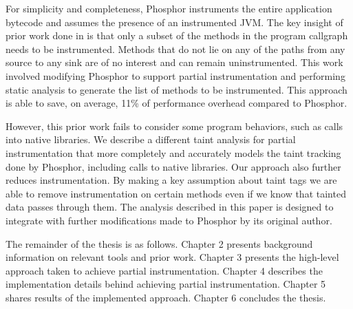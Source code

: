 For simplicity and completeness, Phosphor instruments the entire
application bytecode and assumes the presence of an instrumented
JVM. The key insight of prior work done in \cite{manoj_project} is
that only a subset of the methods in the program callgraph needs to be
instrumented. Methods that do not lie on any of the paths from any
source to any sink are of no interest and can remain
uninstrumented. This work involved modifying Phosphor to support
partial instrumentation and performing static analysis to generate the
list of methods to be instrumented. This approach is able to save, on
average, 11\% of performance overhead compared to Phosphor.

However, this prior work fails to consider some program behaviors,
such as calls into native libraries. We describe a different taint
analysis for partial instrumentation that more completely and
accurately models the taint tracking done by Phosphor, including calls
to native libraries. Our approach also further reduces
instrumentation. By making a key assumption about taint tags we are
able to remove instrumentation on certain methods even if we know that
tainted data passes through them. The analysis described in this paper
is designed to integrate with further modifications made to Phosphor
by its original author.

The remainder of the thesis is as follows. Chapter 2 presents
background information on relevant tools and prior work. Chapter 3
presents the high-level approach taken to achieve partial
instrumentation. Chapter 4 describes the implementation details behind
achieving partial instrumentation. Chapter 5 shares results of the
implemented approach. Chapter 6 concludes the thesis.
